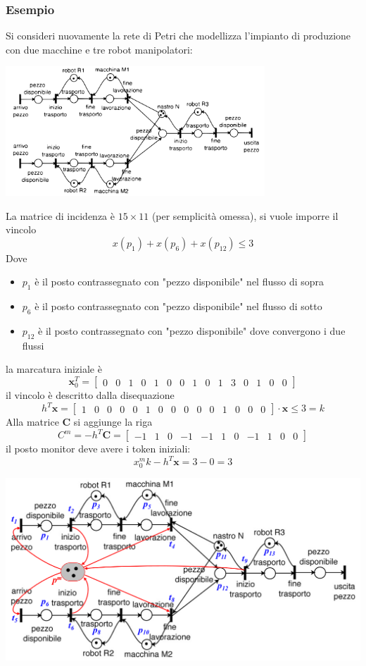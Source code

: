 \documentclass[10pt, letterpaper]{report}
\begin{document}
\subsubsection{Esempio}
Si consideri nuovamente la rete di Petri che modellizza l'impianto di produzione con due macchine e tre robot manipolatori:
\begin{center}
    \includegraphics[width=0.73\textwidth]{images/modelloImpiantoPetri.pdf}
\end{center}
La matrice di incidenza è $15\times 11$ (per semplicità omessa), si vuole imporre il vincolo 
$$ x(p_1)+x(p_6)+x(p_{12})\le 3$$
Dove \begin{itemize}
    \item $p_1$ è il posto contrassegnato con  "pezzo disponibile" nel flusso di sopra 
    \item $p_6$ è il posto contrassegnato con  "pezzo disponibile" nel flusso di sotto 
    \item $p_{12}$ è il posto contrassegnato con "pezzo disponibile" dove convergono i due flussi
\end{itemize}
la marcatura iniziale è 
\setcounter{MaxMatrixCols}{20}
$$ \mathbf{x}_{0}^T = \begin{bmatrix}
0 &0 &1& 0 &1 &0& 0 &1 &0& 1 &3 &0& 1& 0 & 0 
\end{bmatrix}$$
il vincolo è descritto dalla disequazione
$$ h^T \mathbf{x} = \begin{bmatrix}
    1 & 0 & 0 & 0 & 0 & 1 & 0 & 0 & 0 & 0 & 0 & 1 & 0 & 0 & 0
\end{bmatrix} \cdot \mathbf{x} \le 3 = k$$ 
Alla matrice $\mathbf C$ si aggiunge la riga 
$$ C^{m} = -h^T\mathbf C = \begin{bmatrix}
    -1 & 1 & 0 & -1 & -1 & 1 & 0 & -1 & 1 & 0 & 0
\end{bmatrix}$$
il posto monitor deve avere i token iniziali:
$$x_0^mk-h^T\mathbf x = 3-0=3 $$
\begin{center}
    \includegraphics[width=\textwidth]{images/transUC.png}
\end{center}
\end{document}
